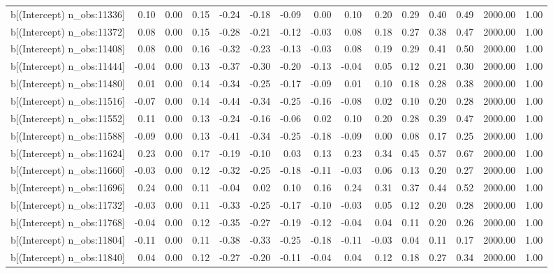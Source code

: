 \begin{table}[ht]
\begin{tabular}{rrrrrrrrrrrrrrr}
  b[(Intercept) n\_obs:11336] & 0.10 & 0.00 & 0.15 & -0.24 & -0.18 & -0.09 & 0.00 & 0.10 & 0.20 & 0.29 & 0.40 & 0.49 & 2000.00 & 1.00 \\ 
  b[(Intercept) n\_obs:11372] & 0.08 & 0.00 & 0.15 & -0.28 & -0.21 & -0.12 & -0.03 & 0.08 & 0.18 & 0.27 & 0.38 & 0.47 & 2000.00 & 1.00 \\ 
  b[(Intercept) n\_obs:11408] & 0.08 & 0.00 & 0.16 & -0.32 & -0.23 & -0.13 & -0.03 & 0.08 & 0.19 & 0.29 & 0.41 & 0.50 & 2000.00 & 1.00 \\ 
  b[(Intercept) n\_obs:11444] & -0.04 & 0.00 & 0.13 & -0.37 & -0.30 & -0.20 & -0.13 & -0.04 & 0.05 & 0.12 & 0.21 & 0.30 & 2000.00 & 1.00 \\ 
  b[(Intercept) n\_obs:11480] & 0.01 & 0.00 & 0.14 & -0.34 & -0.25 & -0.17 & -0.09 & 0.01 & 0.10 & 0.18 & 0.28 & 0.38 & 2000.00 & 1.00 \\ 
  b[(Intercept) n\_obs:11516] & -0.07 & 0.00 & 0.14 & -0.44 & -0.34 & -0.25 & -0.16 & -0.08 & 0.02 & 0.10 & 0.20 & 0.28 & 2000.00 & 1.00 \\ 
  b[(Intercept) n\_obs:11552] & 0.11 & 0.00 & 0.13 & -0.24 & -0.16 & -0.06 & 0.02 & 0.10 & 0.20 & 0.28 & 0.39 & 0.47 & 2000.00 & 1.00 \\ 
  b[(Intercept) n\_obs:11588] & -0.09 & 0.00 & 0.13 & -0.41 & -0.34 & -0.25 & -0.18 & -0.09 & 0.00 & 0.08 & 0.17 & 0.25 & 2000.00 & 1.00 \\ 
  b[(Intercept) n\_obs:11624] & 0.23 & 0.00 & 0.17 & -0.19 & -0.10 & 0.03 & 0.13 & 0.23 & 0.34 & 0.45 & 0.57 & 0.67 & 2000.00 & 1.00 \\ 
  b[(Intercept) n\_obs:11660] & -0.03 & 0.00 & 0.12 & -0.32 & -0.25 & -0.18 & -0.11 & -0.03 & 0.06 & 0.13 & 0.20 & 0.27 & 2000.00 & 1.00 \\ 
  b[(Intercept) n\_obs:11696] & 0.24 & 0.00 & 0.11 & -0.04 & 0.02 & 0.10 & 0.16 & 0.24 & 0.31 & 0.37 & 0.44 & 0.52 & 2000.00 & 1.00 \\ 
  b[(Intercept) n\_obs:11732] & -0.03 & 0.00 & 0.11 & -0.33 & -0.25 & -0.17 & -0.10 & -0.03 & 0.05 & 0.12 & 0.20 & 0.28 & 2000.00 & 1.00 \\ 
  b[(Intercept) n\_obs:11768] & -0.04 & 0.00 & 0.12 & -0.35 & -0.27 & -0.19 & -0.12 & -0.04 & 0.04 & 0.11 & 0.20 & 0.26 & 2000.00 & 1.00 \\ 
  b[(Intercept) n\_obs:11804] & -0.11 & 0.00 & 0.11 & -0.38 & -0.33 & -0.25 & -0.18 & -0.11 & -0.03 & 0.04 & 0.11 & 0.17 & 2000.00 & 1.00 \\ 
  b[(Intercept) n\_obs:11840] & 0.04 & 0.00 & 0.12 & -0.27 & -0.20 & -0.11 & -0.04 & 0.04 & 0.12 & 0.18 & 0.27 & 0.34 & 2000.00 & 1.00 \\ 

\end{tabular}
\end{table}
